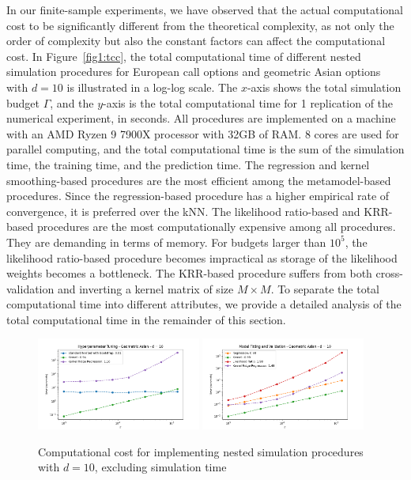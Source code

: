 In our finite-sample experiments, we have observed that the actual computational cost to be significantly different from the theoretical complexity, as not only the order of complexity but also the constant factors can affect the computational cost.
In Figure~\ref{fig1:tcc}, the total computational time of different nested simulation procedures for European call options and geometric Asian options with $d = 10$ is illustrated in a log-log scale.
The $x$-axis shows the total simulation budget $\Gamma$, and the $y$-axis is the total computational time for 1 replication of the numerical experiment, in seconds.
All procedures are implemented on a machine with an AMD Ryzen 9 7900X processor with 32GB of RAM.
8 cores are used for parallel computing, and the total computational time is the sum of the simulation time, the training time, and the prediction time.
The regression and kernel smoothing-based procedures are the most efficient among the metamodel-based procedures.
Since the regression-based procedure has a higher empirical rate of convergence, it is preferred over the kNN.
The likelihood ratio-based and KRR-based procedures are the most computationally expensive among all procedures.
They are demanding in terms of memory.
For budgets larger than $10^5$, the likelihood ratio-based procedure becomes impractical as storage of the likelihood weights becomes a bottleneck.
The KRR-based procedure suffers from both cross-validation and inverting a kernel matrix of size $M \times M$.
To separate the total computational time into different attributes, we provide a detailed analysis of the total computational time in the remainder of this section.

\begin{figure}[ht!]
    \centering
    \includegraphics[width=0.48\textwidth]{./project1/figures/figure12a.png}
    \includegraphics[width=0.48\textwidth]{./project1/figures/figure12b.png}
    \caption{Computational cost for implementing nested simulation procedures with $d=10$, excluding simulation time}
    \label{fig1:c_model}
\end{figure}

